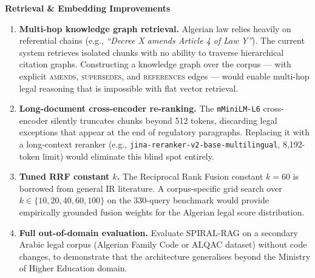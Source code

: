 \documentclass[12pt,a4paper]{article}
\begin{document}
\noindent\textbf{Retrieval \& Embedding Improvements}
\begin{enumerate}[leftmargin=*,nosep]

\item \textbf{Multi-hop knowledge graph retrieval.}
Algerian law relies heavily on referential chains (e.g., \textit{``Decree X amends
Article 4 of Law Y''}). The current system retrieves isolated chunks with no ability
to traverse hierarchical citation graphs. Constructing a knowledge graph over the
corpus — with explicit \textsc{amends}, \textsc{supersedes}, and \textsc{references}
edges — would enable multi-hop legal reasoning that is impossible with flat vector
retrieval.

\item \textbf{Long-document cross-encoder re-ranking.}
The \texttt{mMiniLM-L6} cross-encoder silently truncates chunks beyond 512 tokens,
discarding legal exceptions that appear at the end of regulatory paragraphs.
Replacing it with a long-context reranker (e.g., \texttt{jina-reranker-v2-base-multilingual},
8,192-token limit) would eliminate this blind spot entirely.

\item \textbf{Tuned RRF constant $k$.}
The Reciprocal Rank Fusion constant $k=60$ is borrowed from general IR literature.
A corpus-specific grid search over $k \in \{10, 20, 40, 60, 100\}$ on the 330-query
benchmark would provide empirically grounded fusion weights for the Algerian legal
score distribution.

\item \textbf{Full out-of-domain evaluation.}
Evaluate SPIRAL-RAG on a secondary Arabic legal corpus (Algerian Family Code or ALQAC
dataset) without code changes, to demonstrate that the architecture generalises
beyond the Ministry of Higher Education domain.

\end{enumerate}
\end{document}
